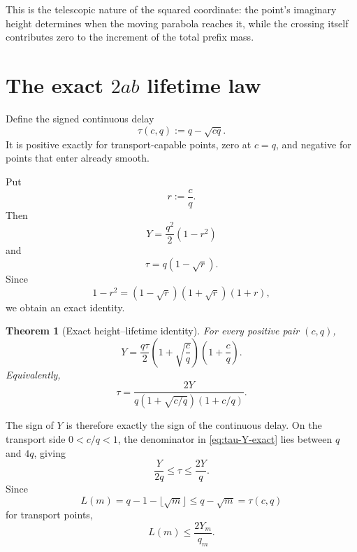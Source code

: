 \documentclass[11pt]{article}
\newtheorem{theorem}{Theorem}[section]
\theoremstyle{definition}
\theoremstyle{remark}
\newcommand{\1}{\mathbf{1}}
\begin{document}
This is the telescopic nature of the squared coordinate: the point's imaginary height determines when the moving parabola reaches it, while the crossing itself contributes zero to the increment of the total prefix mass.

\section{The exact $2ab$ lifetime law}
\label{sec:lifetime-law}

Define the signed continuous delay
\begin{equation}
 \tau(c,q):=q-\sqrt{cq}.
 \label{eq:tau}
\end{equation}
It is positive exactly for transport-capable points, zero at $c=q$, and negative for points that enter already smooth.

Put
\begin{equation}
 r:=\frac cq.
 \label{eq:r-ratio}
\end{equation}
Then
\begin{equation}
 Y=\frac{q^2}{2}(1-r^2)
 \label{eq:Y-r}
\end{equation}
and
\begin{equation}
 \tau=q(1-\sqrt r).
 \label{eq:tau-r}
\end{equation}
Since
\begin{equation}
 1-r^2=(1-\sqrt r)(1+\sqrt r)(1+r),
 \label{eq:factor-r}
\end{equation}
we obtain an exact identity.

\begin{theorem}[Exact height--lifetime identity]
\label{thm:exact-height-lifetime}
For every positive pair $(c,q)$,
\begin{equation}
 \boxed{
 Y
 =
 \frac{q\tau}{2}
 \left(1+\sqrt{\frac cq}\right)
 \left(1+\frac cq\right).
 }
 \label{eq:Y-tau-exact}
\end{equation}
Equivalently,
\begin{equation}
 \boxed{
 \tau
 =
 \frac{2Y}
 {q\left(1+\sqrt{c/q}\right)\left(1+c/q\right)}.
 }
 \label{eq:tau-Y-exact}
\end{equation}
\end{theorem}

The sign of $Y$ is therefore exactly the sign of the continuous delay.  On the transport side $0<c/q<1$, the denominator in \cref{eq:tau-Y-exact} lies between $q$ and $4q$, giving
\begin{equation}
 \frac{Y}{2q}
 \le\tau
 \le\frac{2Y}{q}.
 \label{eq:tau-bounds}
\end{equation}
Since
\begin{equation}
 L(m)=q-1-\lfloor\sqrt m\rfloor
 \le q-\sqrt m=\tau(c,q)
 \label{eq:L-tau}
\end{equation}
for transport points,
\begin{equation}
 \boxed{L(m)\le\frac{2Y_m}{q_m}.}
 \label{eq:L-Y}
\end{equation}
\end{document}
